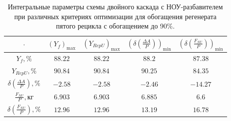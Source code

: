 \begin{table}
    \centering
    \begin{tabular}{|c|cccc|}
        \hline $\cdot$ & $(Y_f)_\text{max}$ & $(Y_{RepU})_\text{max}$ & $(\delta(\frac{\Delta A}{P}))_\text{min}$ & $(\delta(\frac{F_{NU}}{P}))_\text{min}$\\ \hline
    $Y_f, \%$ & $88.22$ & $88.22$ & $88.2$ & $87.38$\\ \hline
    $Y_{RepU}, \%$ & $90.84$ & $90.84$ & $90.25$ & $84.35$\\ \hline
    $\delta(\frac{\Delta A}{P}), \%$ & $-2.58$ & $-2.58$ & $-2.46$ & $-14.27$\\ \hline
    $\frac{F_{NU}}{P}, \text{кг}$ & $6.903$ & $6.903$ & $6.885$ & $6.6$\\ \hline
    $\delta(\frac{F_{NU}}{P}), \%$ & $12.96$ & $12.96$ & $13.19$ & $16.78$\\ \hline
\end{tabular}
\caption{Интегральные параметры схемы двойного каскада с НОУ-разбавителем при различных критериях оптимизации для обогащения регенерата пятого рецикла с обогащением до 90\%.{\label{2opt5_90_int}}}
\end{table}

